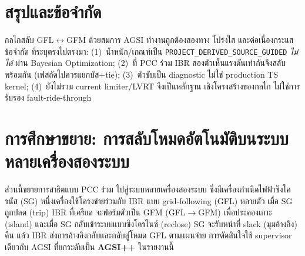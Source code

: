 \documentclass[12pt,a4paper]{article}
\begin{document}
\section{สรุปและข้อจำกัด}
กลไกสลับ GFL$\leftrightarrow$GFM ด้วยสมการ AGSI ทำงานถูกต้องสองทาง โปร่งใส และต่อเนื่องกระแส ข้อจำกัด
ที่ระบุตรงไปตรงมา: (1)~น้ำหนัก/เกณฑ์เป็น \texttt{PROJECT\_DERIVED\_SOURCE\_GUIDED} \emph{ไม่ได้} ผ่าน
Bayesian Optimization; (2)~ที่ PCC ร่วม IBR สองตัวเห็นแรงดันเท่ากันจึงสลับพร้อมกัน (เฟสถัดไปควรแยกบัส+tie);
(3)~ตัวขับเป็น diagnostic ไม่ใช่ production TS kernel; (4)~ยังไม่รวม current limiter/LVRT จึงเป็นหลักฐาน
เชิงโครงสร้างของกลไก ไม่ใช่การรับรอง fault-ride-through

\clearpage
\section{การศึกษาขยาย: การสลับโหมดอัตโนมัติบนระบบหลายเครื่องสองระบบ}
ส่วนนี้ขยายการสาธิตแบบ PCC ร่วม ไปสู่ระบบหลายเครื่องสองระบบ ซึ่งมีเครื่องกำเนิดไฟฟ้าซิงโครนัส (SG)
หนึ่งเครื่องใช้โครงข่ายร่วมกับ IBR แบบ grid-following (GFL) หลายตัว เมื่อ SG ถูกปลด (trip) IBR ที่เครียด
จะฟอร์มตัวเป็น GFM (GFL$\to$GFM) เพื่อประคองเกาะ (island) และเมื่อ SG กลับเข้าระบบแบบซิงโครไนซ์
(reclose) SG จะรับหน้าที่ slack (มุมอ้างอิง) คืน แล้ว IBR ส่งการอ้างอิงกลับและกลับสู่โหมด GFL ตามแผนจ่าย
การตัดสินใจใช้ supervisor เดียวกับ AGSI ที่ยกระดับเป็น \textbf{AGSI++} ในรายงานนี้
\end{document}
